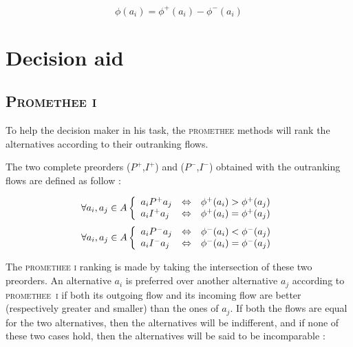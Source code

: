 \begin{equation}
    \phi(a_i) = \phi^+(a_i) - \phi^-(a_i)
    \label{eq:netflow}
\end{equation}

\section{Decision aid}
\subsection{\textsc{Promethee i}}
To help the decision maker in his task, the \textsc{promethee} methods will rank the alternatives according to their outranking flows.

The two complete preorders ($P^+$,$I^+$) and ($P^-$,$I^-$) obtained with the outranking flows are defined as follow \cite{Bertrand2002}:

\begin{equation}
    \forall a_i, a_j \in A \left \{
        \begin{array}[]{l c c}
            a_iP^+a_j & \Leftrightarrow & \phi^+(a_i) > \phi^+(a_j) \\
            a_iI^+a_j & \Leftrightarrow & \phi^+(a_i) = \phi^+(a_j)
        \end{array}
        \right .
    \label{eq:P1_positif_ranking}
\end{equation}
\begin{equation}
    \forall a_i, a_j \in A \left \{
        \begin{array}[]{l c c}
            a_iP^-a_j & \Leftrightarrow & \phi^-(a_i) < \phi^-(a_j) \\
            a_iI^-a_j & \Leftrightarrow & \phi^-(a_i) = \phi^-(a_j)
        \end{array}
        \right .
    \label{eq:P1_negatif_ranking}
\end{equation}

The \textsc{promethee i} ranking is made by taking the intersection of these two preorders. An alternative $a_i$ is preferred over another alternative $a_j$ according to \mbox{\textsc{promethee i}} if both its outgoing flow and its incoming flow are better (respectively greater and smaller) than the ones of $a_j$. If both the flows are equal for the two alternatives, then the alternatives will be indifferent, and if none of these two cases hold, then the alternatives will be said to be incomparable \cite{Bertrand2002}:


